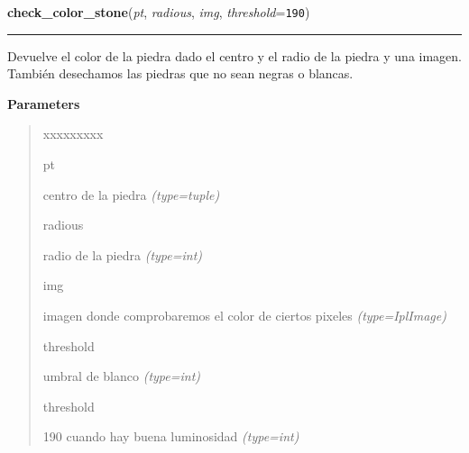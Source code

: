 \hspace{.8\funcindent}\begin{boxedminipage}{\funcwidth}

    \raggedright \textbf{check\_color\_stone}(\textit{pt}, \textit{radious}, \textit{img}, \textit{threshold}={\tt 190})

    \vspace{-1.5ex}

    \rule{\textwidth}{0.5\fboxrule}
\setlength{\parskip}{2ex}
Devuelve el color de la piedra dado el centro y el radio de la piedra y una imagen. También desechamos las piedras que no sean negras o blancas.

\setlength{\parskip}{1ex}
      \textbf{Parameters}
      \vspace{-1ex}

      \begin{quote}
        \begin{Ventry}{xxxxxxxxx}

          \item[pt]


centro de la piedra
            {\it (type=tuple)}

          \item[radious]


radio de la piedra
            {\it (type=int)}

          \item[img]


imagen donde comprobaremos el color de ciertos pixeles
            {\it (type=IplImage)}

          \item[threshold]


umbral de blanco
            {\it (type=int)}

          \item[threshold]


190 cuando hay buena luminosidad
            {\it (type=int)}

        \end{Ventry}

      \end{quote}

    \end{boxedminipage}



